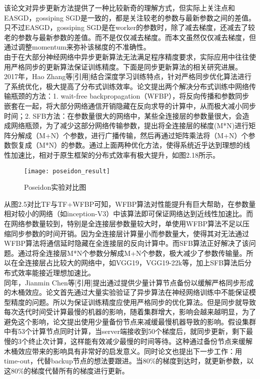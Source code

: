该论文对异步更新方法提供了一种比较新奇的理解方式，但实际上关注点和EASGD，gossiping SGD是一致的，都是关注较老的参数与最新参数之间的差值。只不过EASGD，gossiping SGD是在worker的参数时，除了减去梯度，还减去了较老的参数与最新参数的差值。而不是仅仅减去梯度。而本文虽然仅仅减去梯度，但通过调整momentum来弥补该梯度的不准确性。\\
由于在大部分神经网络中异步更新算法无法满足程序精度要求，实际应用中往往使用严格同步的更新算法保证训练精度。下面是同步更新算法的相关研究进展。\\
2017年，Hao Zhang等[引用]结合深度学习训练特点，针对严格同步优化算法进行了系统优化，极大提高了分布式训练效率。论文提出两个解决分布式训练中网络传输瓶颈的方法：1. wait-free backpropagation（WFBP），将反向传播和参数同步嵌套在一起，将大部分网络通信开销隐藏在反向求导的计算中，从而极大减小同步时间；2. SFB方法：在参数量很大的网络中，某些全连接层的参数量很大，会造成网络瓶颈，为了减少这部分网络传输参数，提出将全连接层的梯度(M*N)进行矩阵分解成（M+N）个参数，进行广播传输，然后再通过矩阵乘法将（M+N）个参数恢复成（M*N）的参数。通过上面两种优化方法，使得系统近乎达到理想的线性加速比，相对于原生框架的分布式效率有极大提升，如图2.18所示。\\
\begin{figure}[htp]
\centering
\texttt{[image: poseidon\_result]}
\caption{Poseidon实验对比图}
\end{figure}
从图2.5对比TF与TF+WFBP可知，WFBP算法对性能提升有巨大帮助，在参数量相对较小的网络（如inception-V3）中该算法即可保证网络达到近线性加速比。而在网络参数量较到，特别是全连接层参数量较大时，单使用WFBP算法不足以压缩同步参数的时间开销。因为全连接层计算量小而参数量大，使得其对无法通过WFBP算法将通信延时隐藏在全连接层的反向计算中。而SFB算法正好解决了该问题。通过将全连接层M*N个参数分解成M+N个参数，极大减少了参数传输量。所以在全连接层占比较大的网络中，如VGG19，VGG19-22k等，加上SFB算法后分布式效率能接近理想加速比。\\
同年，Jianmin Chen等[引用]提出通过提供少量计算节点备份以缓解严格同步形成的木桶效应。论文首先通过大量实验验证了异步算法在神经网络训练中不能保证模型精度的问题。所以为保证训练精度应使用严格同步的优化算法。但是同步就导致每次迭代时间受计算最慢的机器的影响，随着集群增大，影响会越来越明显，为了避免这个影响，论文提出使用少量备份节点来减缓最慢机器导致的影响。假设集群中有53个计算节点同时计算，当server端接收到50个梯度后，就同步更新，剩下最慢的3个终止次计算，这样能有效减少最慢的时间等待。这种通过备份节点来缓解木桶效应带来的影响具有非常好的启发意义。同时论文也提出下一步工作：用time-out，代替backup节点的想法要跟进。当80\%的梯度到达时，就更新参数，以这80\%的梯度代替所有的梯度进行更新。\\
